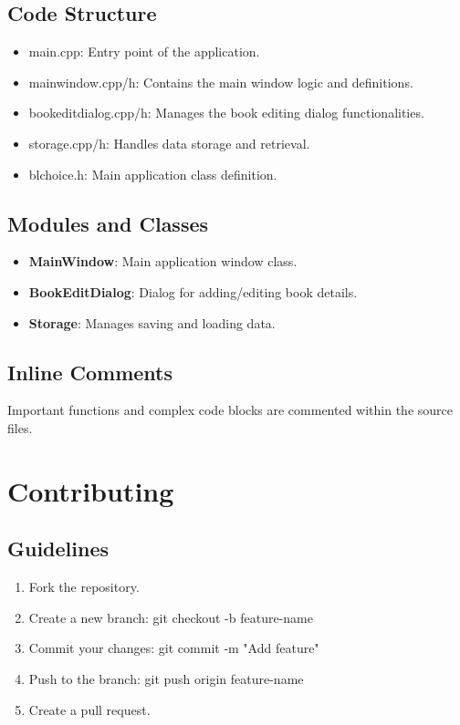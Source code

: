 \documentclass{article}
\begin{document}
\subsection{Code Structure}

\begin{itemize}
    \item {main.cpp}:
    Entry point of the application.
    \item {mainwindow.cpp/h}:
    Contains the main window logic and definitions.
    \item {bookeditdialog.cpp/h}:
    Manages the book editing dialog functionalities.
    \item {storage.cpp/h}:
    Handles data storage and retrieval.
    \item {blchoice.h}:
    Main application class definition.
\end{itemize}


\subsection{Modules and Classes}


\begin{itemize}
    \item \textbf{MainWindow}:
    Main application window class.
    \item \textbf{BookEditDialog}:
    Dialog for adding/editing book details.
    \item \textbf{Storage}:
    Manages saving and loading data.
\end{itemize}


\subsection{Inline Comments}

Important functions and complex code blocks are commented within the source files.



\section{Contributing}


\subsection{Guidelines}

\begin{enumerate}
    \item Fork the repository.
    \item Create a new branch:
    git checkout -b feature-name
    \item Commit your changes:
    git commit -m "Add feature"
    \item Push to the branch:
    git push origin feature-name
    \item Create a pull request.
\end{enumerate}
\end{document}
